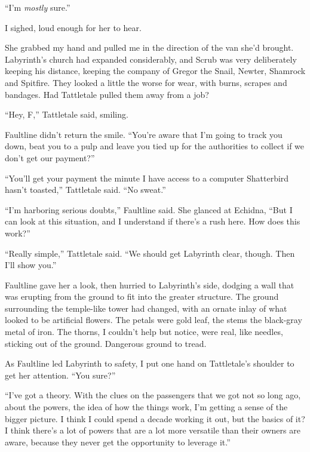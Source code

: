 ``I'm \emph{mostly} sure.''



I sighed, loud enough for her to hear.



She grabbed my hand and pulled me in the direction of the van she'd brought.  Labyrinth's church had expanded considerably, and Scrub was very deliberately keeping his distance, keeping the company of Gregor the Snail, Newter, Shamrock and Spitfire.  They looked a little the worse for wear, with burns, scrapes and bandages.  Had Tattletale pulled them away from a job?



``Hey, F,'' Tattletale said, smiling.



Faultline didn't return the smile.  ``You're aware that I'm going to track you down, beat you to a pulp and leave you tied up for the authorities to collect if we don't get our payment?''



``You'll get your payment the minute I have access to a computer Shatterbird hasn't toasted,'' Tattletale said.  ``No sweat.''



``I'm harboring serious doubts,'' Faultline said.  She glanced at Echidna, ``But I can look at this situation, and I understand if there's a rush here.  How does this work?''



``Really simple,'' Tattletale said.  ``We should get Labyrinth clear, though.  Then I'll show you.''



Faultline gave her a look, then hurried to Labyrinth's side, dodging a wall that was erupting from the ground to fit into the greater structure.  The ground surrounding the temple-like tower had changed, with an ornate inlay of what looked to be artificial flowers.  The petals were gold leaf, the stems the black-gray metal of iron.  The thorns, I couldn't help but notice, were real, like needles, sticking out of the ground.  Dangerous ground to tread.



As Faultline led Labyrinth to safety, I put one hand on Tattletale's shoulder to get her attention.  ``You sure?''



``I've got a theory.  With the clues on the passengers that we got not so long ago, about the powers, the idea of how the things work, I'm getting a sense of the bigger picture.  I think I could spend a decade working it out, but the basics of it?  I think there's a lot of powers that are a lot more versatile than their owners are aware, because they never get the opportunity to leverage it.''



